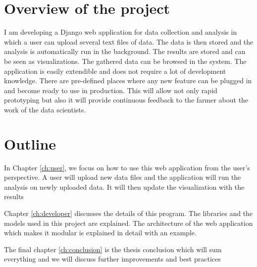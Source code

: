 \section{Overview of the project}

I am developing a Django web application for data collection and analysis in
which a user can upload several text files of data. The data is then stored and
the analysis is automatically run in the background. The results are stored and
can be seen as visualizations. The gathered data can be browsed in the system.
The application is easily extendible and does not require a lot of development
knowledge. There are pre-defined places where any new feature can be plugged in
and become ready to use in production. This will allow not only rapid
prototyping but also it will provide continuous feedback to the farmer about the
work of the data scientists.

\section{Outline}

In Chapter \ref{ch:user}, we focus on how to use this web application from the
user's perspective. A user will upload new data files and the application will
run the analysis on newly uploaded data. It will then update the visualization
with the results

Chapter \ref{ch:developer} discusses the details of this program. The libraries
and the models used in this project are explained. The architecture of the web
application which makes it modular is explained in detail with an example.

The final chapter \ref{ch:conclusion} is the thesis conclusion which will sum
everything and we will discuss further improvements and best practices